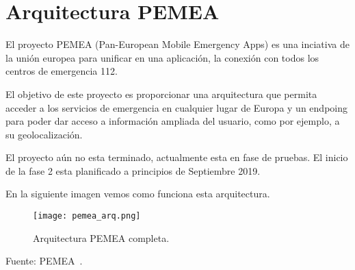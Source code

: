 
\section{Arquitectura PEMEA}

El proyecto PEMEA (Pan-European Mobile Emergency Apps) es una
 inciativa de la unión europea para unificar en una aplicación, la conexión 
con todos los centros de emergencia 112.

El objetivo de este proyecto es proporcionar una arquitectura que permita
 acceder a los servicios de emergencia en cualquier lugar de Europa y un 
endpoing para poder dar acceso a información ampliada del usuario, como
 por ejemplo, a su geolocalización.

El proyecto aún no esta terminado, actualmente esta en fase de pruebas.
 El inicio de la fase 2 esta planificado a principios de Septiembre 2019.

En la siguiente imagen vemos como funciona esta arquitectura.

\begin{figure}[h]
\texttt{[image: pemea\_arq.png]} 
\caption{Arquitectura PEMEA completa.}
\end{figure}

Fuente: PEMEA~\cite{PEMEA}.